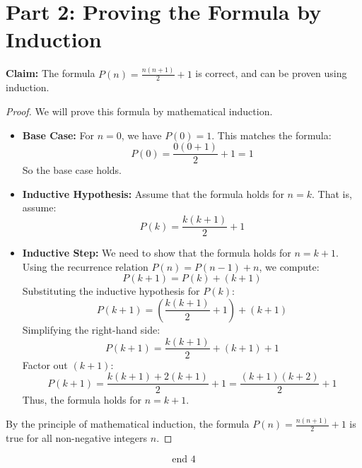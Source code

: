 \documentclass[10pt, AMS Euler]{article}
\begin{document}
    \section*{Part 2: Proving the Formula by Induction}
    
    \noindent\textbf{Claim:} The formula $P(n) = \frac{n(n+1)}{2} + 1$ is correct, and can be proven using induction.
    
    \begin{proof}
        We will prove this formula by mathematical induction.
    
        \begin{itemize}
            \item \textbf{Base Case:} For $n = 0$, we have $P(0) = 1$. This matches the formula:
            \[
            P(0) = \frac{0(0+1)}{2} + 1 = 1
            \]
            So the base case holds.
    
            \item \textbf{Inductive Hypothesis:} Assume that the formula holds for $n = k$. That is, assume:
            \[
            P(k) = \frac{k(k+1)}{2} + 1
            \]
    
            \item \textbf{Inductive Step:} We need to show that the formula holds for $n = k+1$. Using the recurrence relation $P(n) = P(n-1) + n$, we compute:
            \[
            P(k+1) = P(k) + (k+1)
            \]
            Substituting the inductive hypothesis for $P(k)$:
            \[
            P(k+1) = \left( \frac{k(k+1)}{2} + 1 \right) + (k+1)
            \]
            Simplifying the right-hand side:
            \[
            P(k+1) = \frac{k(k+1)}{2} + (k+1) + 1
            \]
            Factor out $(k+1)$:
            \[
            P(k+1) = \frac{k(k+1) + 2(k+1)}{2} + 1 = \frac{(k+1)(k+2)}{2} + 1
            \]
            Thus, the formula holds for $n = k+1$.
    
        \end{itemize}
    
        By the principle of mathematical induction, the formula $P(n) = \frac{n(n+1)}{2} + 1$ is true for all non-negative integers $n$.
    \end{proof}
        \[
        \boxed{\text{end 4}}
        \]
	\noindent \underline{\hspace{3in}}
\end{document}
